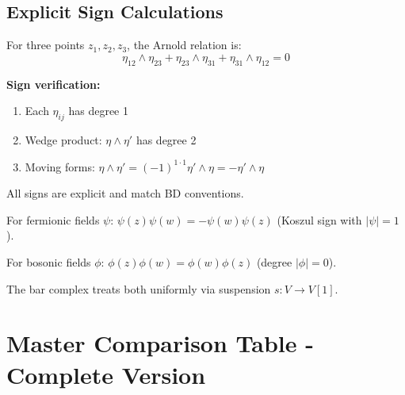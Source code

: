 \subsection{Explicit Sign Calculations}

\begin{example}\label{ex:arnold-sign-explicit-dict}
For three points $z_1, z_2, z_3$, the Arnold relation is:
$$\eta_{12} \wedge \eta_{23} + \eta_{23} \wedge \eta_{31} + \eta_{31} \wedge \eta_{12} = 0$$

\textbf{Sign verification:}
\begin{enumerate}
\item Each $\eta_{ij}$ has degree 1
\item Wedge product: $\eta \wedge \eta'$ has degree 2
\item Moving forms: $\eta \wedge \eta' = (-1)^{1 \cdot 1} \eta' \wedge \eta = -\eta' \wedge \eta$
\end{enumerate}

All signs are explicit and match BD conventions.
\end{example}

\begin{remark}\label{rem:fermionic-bosonic-signs-dict}
For fermionic fields $\psi$: $\psi(z)\psi(w) = -\psi(w)\psi(z)$ (Koszul sign with $|\psi| = 1$).

For bosonic fields $\phi$: $\phi(z)\phi(w) = \phi(w)\phi(z)$ (degree $|\phi| = 0$).

The bar complex treats both uniformly via suspension $s: V \to V[1]$.
\end{remark}


\section{Master Comparison Table - Complete Version}
\label{sec:master-comparison-signs}

